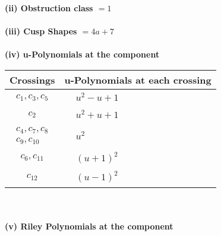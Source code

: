 \documentclass[1p]{elsarticle_modified}
\theoremstyle{definition}
\begin{document}
\flushleft \textbf{(ii) Obstruction class $= 1$}\\~\\
\flushleft \textbf{(iii) Cusp Shapes $= 4 a+7$}\\~\\
\newpage\renewcommand{\arraystretch}{1}
\flushleft \textbf{(iv) u-Polynomials at the component}\newline \\
\begin{tabular}{m{50pt}|m{274pt}}
Crossings & \hspace{64pt}u-Polynomials at each crossing \\
\hline $$\begin{aligned}c_{1},c_{3},c_{5}\end{aligned}$$&$\begin{aligned}
&u^2- u+1
\end{aligned}$\\
\hline $$\begin{aligned}c_{2}\end{aligned}$$&$\begin{aligned}
&u^2+u+1
\end{aligned}$\\
\hline $$\begin{aligned}c_{4},c_{7},c_{8}\\c_{9},c_{10}\end{aligned}$$&$\begin{aligned}
&u^2
\end{aligned}$\\
\hline $$\begin{aligned}c_{6},c_{11}\end{aligned}$$&$\begin{aligned}
&(u+1)^2
\end{aligned}$\\
\hline $$\begin{aligned}c_{12}\end{aligned}$$&$\begin{aligned}
&(u-1)^2
\end{aligned}$\\
\hline
\end{tabular}\\~\\
\newpage\renewcommand{\arraystretch}{1}
\flushleft \textbf{(v) Riley Polynomials at the component}\newline \\
\end{document}
